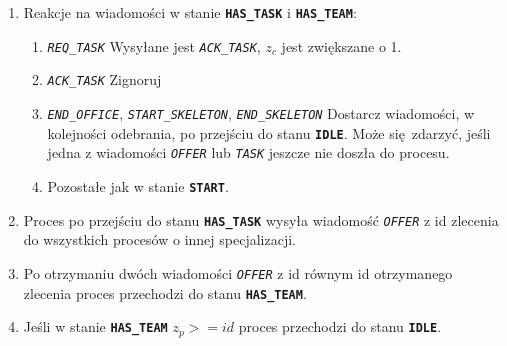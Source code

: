 \documentclass[12pt]{article}
\newcommand{\state}[1]{\texttt{\textbf{#1}}}
\newcommand{\msg}[1]{\texttt{\emph{#1}}}
\begin{document}
\begin{enumerate}
	\item Reakcje na wiadomości w stanie \state{HAS\_TASK} i \state{HAS\_TEAM}:
	\begin{enumerate}
		\item \msg{REQ\_TASK} Wysyłane jest \msg{ACK\_TASK}, \(z_c\) jest zwiększane o 1.
		\item \msg{ACK\_TASK} Zignoruj
		\item \msg{END\_OFFICE}, \msg{START\_SKELETON}, \msg{END\_SKELETON} Dostarcz wiadomości, w kolejności odebrania, po przejściu do stanu \state{IDLE}. Może się zdarzyć, jeśli jedna z wiadomości \msg{OFFER} lub \msg{TASK} jeszcze nie doszła do procesu.
		\item  Pozostałe jak w stanie \state{START}.
	\end{enumerate}
	
	\item Proces po przejściu do stanu \state{HAS\_TASK} wysyła wiadomość \msg{OFFER} z id zlecenia do wszystkich procesów o innej specjalizacji.
	
	\item Po otrzymaniu dwóch wiadomości \msg{OFFER} z id równym id otrzymanego zlecenia proces przechodzi do stanu \state{HAS\_TEAM}.
	
	\item Jeśli w stanie \state{HAS\_TEAM} $z_p >= id$ proces przechodzi do stanu \state{IDLE}.
\end{enumerate}
\end{document}
